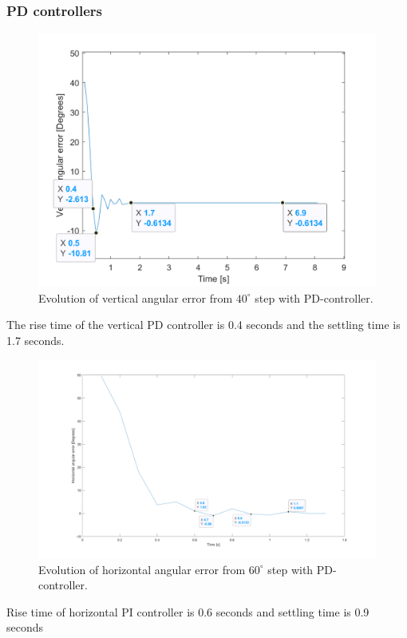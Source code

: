 \subsubsection{PD controllers}
\begin{figure}[H]
\centering
\includegraphics[width=\textwidth]{assets/Vertical_PD_controller.png}
\caption{Evolution of vertical angular error from \(40^{\circ}\) step with PD-controller.}
\label{vert_P}
\end{figure}
The rise time of the vertical PD controller is 0.4 seconds and the settling time is 1.7 seconds.
\begin{figure}[H]
\centering
\includegraphics[width=\textwidth]{assets/Horizontal_PD_controller.png}
\caption{Evolution of horizontal angular error from \(60^{\circ}\) step with PD-controller.}
\label{vert_P}
\end{figure}
Rise time of horizontal PI controller is 0.6 seconds and settling time is 0.9 seconds

